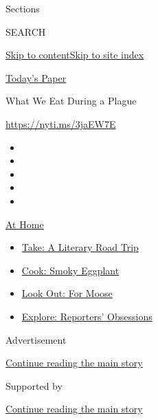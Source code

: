 Sections

SEARCH

\protect\hyperlink{site-content}{Skip to
content}\protect\hyperlink{site-index}{Skip to site index}

\href{https://myaccount.nytimes.com/auth/login?response_type=cookie\&client_id=vi}{}

\href{https://www.nytimes.com/section/todayspaper}{Today's Paper}

What We Eat During a Plague

\url{https://nyti.ms/3jaEW7E}

\begin{itemize}
\item
\item
\item
\item
\item
\end{itemize}

\href{https://www.nytimes.com/spotlight/at-home?action=click\&pgtype=Article\&state=default\&region=TOP_BANNER\&context=at_home_menu}{At
Home}

\begin{itemize}
\tightlist
\item
  \href{https://www.nytimes.com/2020/07/28/books/time-for-a-literary-road-trip.html?action=click\&pgtype=Article\&state=default\&region=TOP_BANNER\&context=at_home_menu}{Take:
  A Literary Road Trip}
\item
  \href{https://www.nytimes.com/2020/07/29/magazine/bored-with-your-home-cooking-some-smoky-eggplant-will-fix-that.html?action=click\&pgtype=Article\&state=default\&region=TOP_BANNER\&context=at_home_menu}{Cook:
  Smoky Eggplant}
\item
  \href{https://www.nytimes.com/2020/07/27/travel/moose-michigan-isle-royale.html?action=click\&pgtype=Article\&state=default\&region=TOP_BANNER\&context=at_home_menu}{Look
  Out: For Moose}
\item
  \href{https://www.nytimes.com/interactive/2020/at-home/even-more-reporters-editors-diaries-lists-recommendations.html?action=click\&pgtype=Article\&state=default\&region=TOP_BANNER\&context=at_home_menu}{Explore:
  Reporters' Obsessions}
\end{itemize}

Advertisement

\protect\hyperlink{after-top}{Continue reading the main story}

Supported by

\protect\hyperlink{after-sponsor}{Continue reading the main story}

